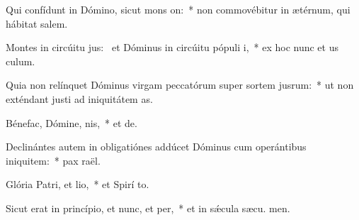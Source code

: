 \item Qui confídunt in Dómino, sicut mons on:~* non commovébitur in ætérnum, qui hábitat  salem.
\item Montes in circúitu jus:~\pscross{} et Dóminus in circúitu pópuli i,~* ex hoc nunc et us  culum.
\item Quia non relínquet Dóminus virgam peccatórum super sortem jusrum:~* ut non exténdant justi ad iniquitátem  as.
\item Bénefac, Dómine, nis,~* et  de.
\item Declinántes autem in obligatiónes addúcet Dóminus cum operántibus iniquitem:~* pax  raël.
\item Glória Patri, et lio,~* et Spirí to.
\item Sicut erat in princípio, et nunc, et per,~* et in sǽcula sæcu. men.
